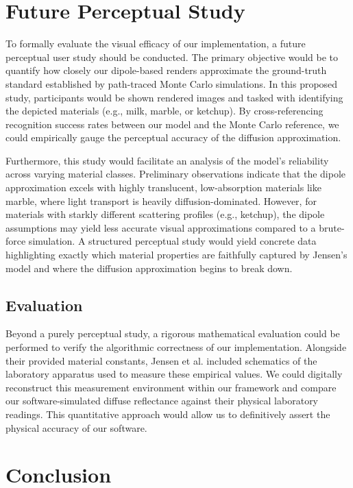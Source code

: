 \documentclass[sigconf,nonacm]{acmart}
\begin{document}
\section{Future Perceptual Study}

To formally evaluate the visual efficacy of our implementation, a future perceptual user study should be conducted. The primary objective would be to quantify how closely our dipole-based renders approximate the ground-truth standard established by path-traced Monte Carlo simulations. In this proposed study, participants would be shown rendered images and tasked with identifying the depicted materials (e.g., milk, marble, or ketchup). By cross-referencing recognition success rates between our model and the Monte Carlo reference, we could empirically gauge the perceptual accuracy of the diffusion approximation.

Furthermore, this study would facilitate an analysis of the model's reliability across varying material classes. Preliminary observations indicate that the dipole approximation excels with highly translucent, low-absorption materials like marble, where light transport is heavily diffusion-dominated. However, for materials with starkly different scattering profiles (e.g., ketchup), the dipole assumptions may yield less accurate visual approximations compared to a brute-force simulation. A structured perceptual study would yield concrete data highlighting exactly which material properties are faithfully captured by Jensen's model and where the diffusion approximation begins to break down.

\subsection{Evaluation}

Beyond a purely perceptual study, a rigorous mathematical evaluation could be performed to verify the algorithmic correctness of our implementation. Alongside their provided material constants, Jensen et al. included schematics of the laboratory apparatus used to measure these empirical values. We could digitally reconstruct this measurement environment within our framework and compare our software-simulated diffuse reflectance against their physical laboratory readings. This quantitative approach would allow us to definitively assert the physical accuracy of our software.

\section{Conclusion}
\end{document}
